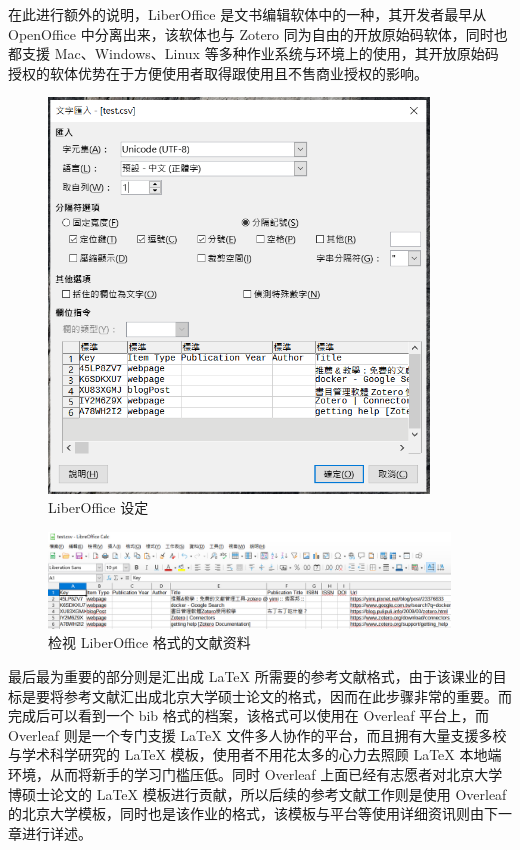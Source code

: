 在此进行额外的说明，LiberOffice 是文书编辑软体中的一种，其开发者最早从 OpenOffice 中分离出来，该软体也与 Zotero 同为自由的开放原始码软体，同时也都支援 Mac、Windows、Linux 等多种作业系统与环境上的使用，其开放原始码授权的软体优势在于方便使用者取得跟使用且不售商业授权的影响。

\begin{figure}[htb]
\centering 
\includegraphics[width=0.90\textwidth]{img/c2m7.png} 
\caption{LiberOffice 设定}
\label{Test}
\end{figure}

\begin{figure}[htb]
\centering 
\includegraphics[width=0.95\textwidth]{img/c2m8.png} 
\caption{检视 LiberOffice 格式的文献资料}
\label{Test}
\end{figure}

最后最为重要的部分则是汇出成 LaTeX 所需要的参考文献格式，由于该课业的目标是要将参考文献汇出成北京大学硕士论文的格式，因而在此步骤非常的重要。而完成后可以看到一个 bib 格式的档案，该格式可以使用在 Overleaf 平台上，而  Overleaf 则是一个专门支援 LaTeX 文件多人协作的平台，而且拥有大量支援多校与学术科学研究的 LaTeX 模板，使用者不用花太多的心力去照顾 LaTeX 本地端环境，从而将新手的学习门槛压低。同时 Overleaf 上面已经有志愿者对北京大学博硕士论文的 LaTeX 模板进行贡献，所以后续的参考文献工作则是使用 Overleaf 的北京大学模板，同时也是该作业的格式，该模板与平台等使用详细资讯则由下一章进行详述。


